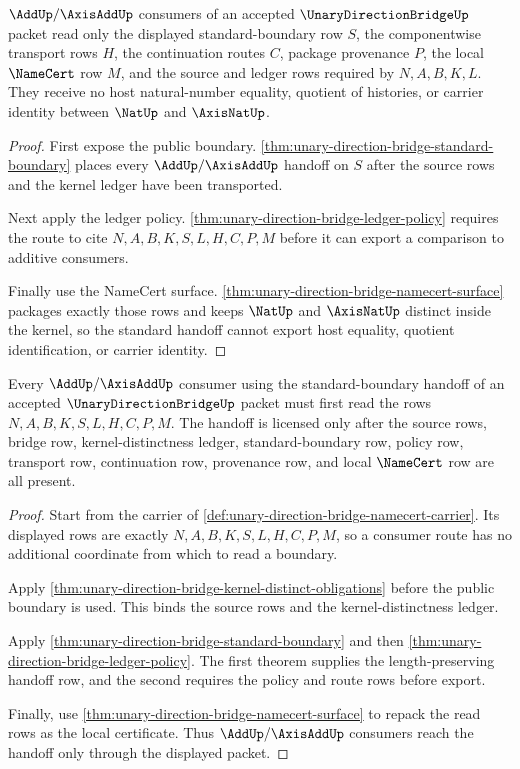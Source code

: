 \begin{theorem}
\label{thm:unary-direction-bridge-standard-handoff-obligation}
$\AddUp/\AxisAddUp$ consumers of an accepted $\UnaryDirectionBridgeUp$ packet read only the displayed standard-boundary row $S$, the componentwise transport rows $H$, the continuation routes $C$, package provenance $P$, the local $\NameCert$ row $M$, and the source and ledger rows required by $N,A,B,K,L$. They receive no host natural-number equality, quotient of histories, or carrier identity between $\NatUp$ and $\AxisNatUp$.
\end{theorem}
\begin{proof}
First expose the public boundary. \autoref{thm:unary-direction-bridge-standard-boundary} places every $\AddUp/\AxisAddUp$ handoff on $S$ after the source rows and the kernel ledger have been transported.

Next apply the ledger policy. \autoref{thm:unary-direction-bridge-ledger-policy} requires the route to cite $N,A,B,K,S,L,H,C,P,M$ before it can export a comparison to additive consumers.

Finally use the NameCert surface. \autoref{thm:unary-direction-bridge-namecert-surface} packages exactly those rows and keeps $\NatUp$ and $\AxisNatUp$ distinct inside the kernel, so the standard handoff cannot export host equality, quotient identification, or carrier identity.
\end{proof}

\begin{theorem}
\label{thm:unary-direction-bridge-axisadd-handoff-obligations}
Every $\AddUp/\AxisAddUp$ consumer using the standard-boundary handoff of an
accepted $\UnaryDirectionBridgeUp$ packet must first read the rows
$N,A,B,K,S,L,H,C,P,M$. The handoff is licensed only after the source rows,
bridge row, kernel-distinctness ledger, standard-boundary row, policy row,
transport row, continuation row, provenance row, and local $\NameCert$ row are
all present.
\end{theorem}
\begin{proof}
Start from the carrier of
\autoref{def:unary-direction-bridge-namecert-carrier}. Its displayed rows are
exactly $N,A,B,K,S,L,H,C,P,M$, so a consumer route has no additional coordinate
from which to read a boundary.

Apply \autoref{thm:unary-direction-bridge-kernel-distinct-obligations} before
the public boundary is used. This binds the source rows and the
kernel-distinctness ledger.

Apply \autoref{thm:unary-direction-bridge-standard-boundary} and then
\autoref{thm:unary-direction-bridge-ledger-policy}. The first theorem supplies
the length-preserving handoff row, and the second requires the policy and route
rows before export.

Finally, use \autoref{thm:unary-direction-bridge-namecert-surface} to repack
the read rows as the local certificate. Thus $\AddUp/\AxisAddUp$ consumers reach
the handoff only through the displayed packet.
\end{proof}

